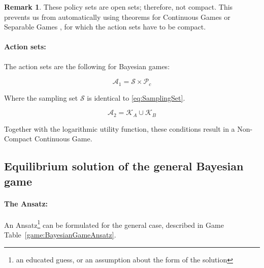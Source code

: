 \documentclass{article}
\theoremstyle{definition}
\newtheorem*{remark}{Remark}
\begin{document}
\begin{remark}
These policy sets are open sets; therefore, not compact.
This prevents us from automatically using theorems for Continuous Games \cite{paper:ContinuousEquilibrium} or Separable Games \cite{paper:SeparableGames}, for which the action sets have to be compact.

\end{remark}

\paragraph{Action sets:}

The action sets are the following for Bayesian games:

\begin{equation}
    \mathcal{A}_1 = \mathcal{S} \times \mathcal{P}_c
\end{equation}

Where the sampling set $\mathcal{S}$ is identical to \eqref{eq:SamplingSet}.

\begin{equation}
    \mathcal{A}_2 = \mathcal{K}_A \cup \mathcal{K}_B
\end{equation}

Together with the logarithmic utility function, these conditions result in a Non-Compact Continuous Game.

\subsection{Equilibrium solution of the general Bayesian game}
\label{sec:EquilibriumSolutionGeneralBayesianGame}

\paragraph{The Ansatz:}

An Ansatz\footnote{an educated guess, or an assumption about the form of the solution} can be formulated for the general case, described in Game Table~\ref{game:BayesianGameAnsatz}.
\end{document}

